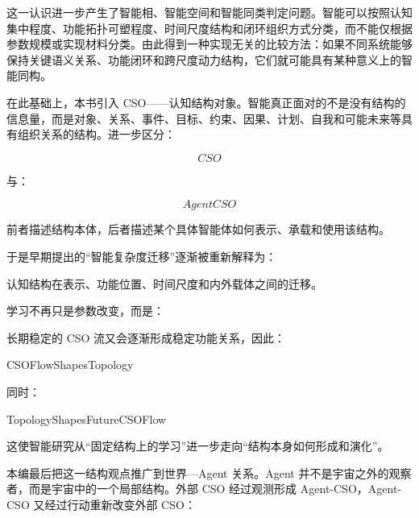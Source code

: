这一认识进一步产生了智能相、智能空间和智能同类判定问题。智能可以按照认知集中程度、功能拓扑可塑程度、时间尺度结构和闭环组织方式分类，而不能仅根据参数规模或实现材料分类。由此得到一种实现无关的比较方法：如果不同系统能够保持关键语义关系、功能闭环和跨尺度动力结构，它们就可能具有某种意义上的智能同构。

在此基础上，本书引入 CSO——认知结构对象。智能真正面对的不是没有结构的信息量，而是对象、关系、事件、目标、约束、因果、计划、自我和可能未来等具有组织关系的结构。进一步区分：

$$
CSO
$$

与：

$$
AgentCSO
$$

前者描述结构本体，后者描述某个具体智能体如何表示、承载和使用该结构。

于是早期提出的“智能复杂度迁移”逐渐被重新解释为：

\begin{statementbox}
认知结构在表示、功能位置、时间尺度和内外载体之间的迁移。
\end{statementbox}

学习不再只是参数改变，而是：

\begin{statementbox}
\centering
{}
\end{statementbox}

长期稳定的 CSO 流又会逐渐形成稳定功能关系，因此：

\begin{statementbox}
CSOFlowShapesTopology
\end{statementbox}

同时：

\begin{statementbox}
TopologyShapesFutureCSOFlow
\end{statementbox}

这使智能研究从“固定结构上的学习”进一步走向“结构本身如何形成和演化”。

本编最后把这一结构观点推广到世界—Agent 关系。Agent 并不是宇宙之外的观察者，而是宇宙中的一个局部结构。外部 CSO 经过观测形成 Agent-CSO，Agent-CSO 又经过行动重新改变外部 CSO：

\begin{statementbox}
\centering
{}
\end{statementbox}


